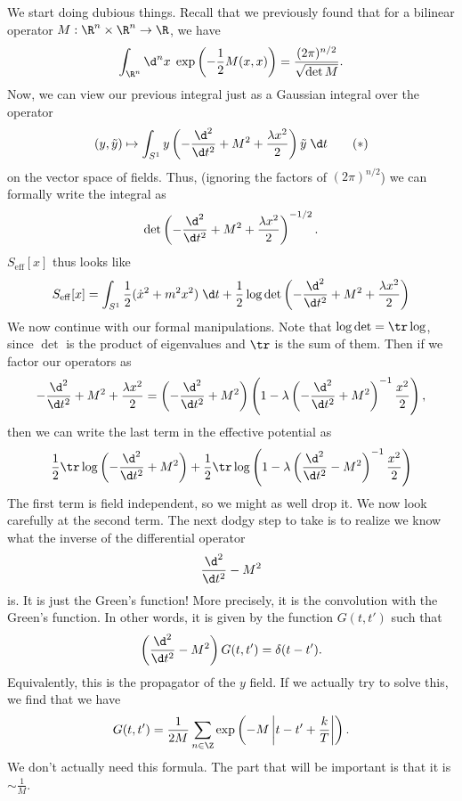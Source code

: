 \documentclass[a4paper]{article}
\begin{document}
We start doing dubious things. Recall that we previously found that for a bilinear operator $M: \R^n \times \R^n \to \R$, we have
\[
  \int_{\R^n} \d^n x\; \exp\left(- \frac{1}{2} M(x, x)\right) = \frac{(2 \pi)^{n/2}}{\sqrt{\det{M}}}.
\]
Now, we can view our previous integral just as a Gaussian integral over the operator
\[
  (y, \tilde{y}) \mapsto \int_{S^1} y\left(-\frac{\d^2}{\d t^2} + M^2 + \frac{\lambda x^2}{2}\right) \tilde{y} \;\d t\tag{$*$}
\]
on the vector space of fields. Thus, (ignoring the factors of $(2\pi)^{n/2}$) we can formally write the integral as
\[
  \det \left(-\frac{\d^2}{\d t^2} + M^2 + \frac{\lambda x^2}{2}\right)^{-1/2}.
\]
$S_{\mathrm{eff}}[x]$ thus looks like
\[
  S_{\mathrm{eff}}[x] = \int_{S^1} \frac{1}{2}(\dot{x}^2 + m^2 x^2) \;\d t + \frac{1}{2} \log \det \left(-\frac{\d^2}{\d t^2} + M^2 + \frac{\lambda x^2}{2}\right)
\]
We now continue with our formal manipulations. Note that $\log \det = \tr \log$, since $\det$ is the product of eigenvalues and $\tr$ is the sum of them. Then if we factor our operators as
\[
  -\frac{\d^2}{\d t^2} + M^2 + \frac{\lambda x^2}{2} = \left(-\frac{\d^2}{\d t^2} + M^2\right)\left(1 - \lambda \left(-\frac{\d^2}{\d t^2} + M^2\right)^{-1} \frac{x^2}{2}\right),
\]
then we can write the last term in the effective potential as
\[
 \frac{1}{2} \tr \log \left(-\frac{\d^2}{\d t^2} + M^2\right) + \frac{1}{2} \tr \log \left(1 - \lambda \left(\frac{\d^2}{\d t^2} - M^2\right)^{-1} \frac{x^2}{2}\right)
\]
The first term is field independent, so we might as well drop it. We now look carefully at the second term. The next dodgy step to take is to realize we know what the inverse of the differential operator
\[
  \frac{\d^2}{\d t^2} - M^2
\]
is. It is just the Green's function! More precisely, it is the convolution with the Green's function. In other words, it is given by the function $G(t, t')$ such that
\[
  \left(\frac{\d^2}{\d t^2} - M^2 \right) G(t, t') = \delta(t - t').
\]
Equivalently, this is the propagator of the $y$ field. If we actually try to solve this, we find that we have
\[
  G(t, t') = \frac{1}{2M} \sum_{n \in \Z} \exp\left(-M \left|t - t' + \frac{k}{T}\right|\right).
\]
We don't actually need this formula. The part that will be important is that it is $\sim \frac{1}{M}$.
\end{document}
